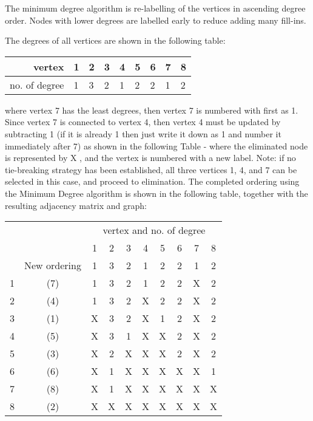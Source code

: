 The minimum degree algorithm is re-labelling of the vertices in ascending degree
order. Nodes with lower degrees are labelled early to reduce adding many
fill-ins.

The degrees of all vertices are shown in the following table:
    \begin{center}
        \begin{tabular}{ r | l l l l l l l l }
        vertex          & 1 & 2 & 3 & 4 & 5 & 6 & 7 & 8 \\
        \hline
        no. of degree   & 1 & 3 & 2 & 1 & 2 & 2 & 1 & 2 \\
    \end{tabular}
\end{center}
where vertex 7 has the least degrees, then vertex 7 is numbered with first as 1.
Since vertex 7 is connected to vertex 4, then vertex 4 must be updated by
subtracting 1 (if it is already 1 then just write it down as 1 and number it
immediately after 7) as shown in the following Table - where the eliminated node
is represented by X , and the vertex is numbered with a new label. Note: if no
tie-breaking strategy has been established, all three vertices 1, 4, and 7 can
be selected in this case, and proceed to elimination. The completed ordering
using the Minimum Degree algorithm is shown in the following table, together
with the resulting adjacency matrix and graph:
\begin{center}
    \begin{tabular}{cc|cccccccc}
        \multicolumn{2}{p{1.5cm}|}{} &
        \multicolumn{8}{c}{vertex and no. of degree} \\
        \small
            &               & 1 & 2 & 3 & 4 & 5 & 6 & 7 & 8 \\
            &New ordering   & 1 & 3 & 2 & 1 & 2 & 2 & 1 & 2 \\
        \hline
         1  &(7)            & 1 & 3 & 2 & 1 & 2 & 2 & X & 2 \\
         2  &(4)            & 1 & 3 & 2 & X & 2 & 2 & X & 2 \\
         3  &(1)            & X & 3 & 2 & X & 1 & 2 & X & 2 \\
         4  &(5)            & X & 3 & 1 & X & X & 2 & X & 2 \\
         5  &(3)            & X & 2 & X & X & X & 2 & X & 2 \\
         6  &(6)            & X & 1 & X & X & X & X & X & 1 \\
         7  &(8)            & X & 1 & X & X & X & X & X & X \\
         8  &(2)            & X & X & X & X & X & X & X & X \\
    \end{tabular}
\end{center}

